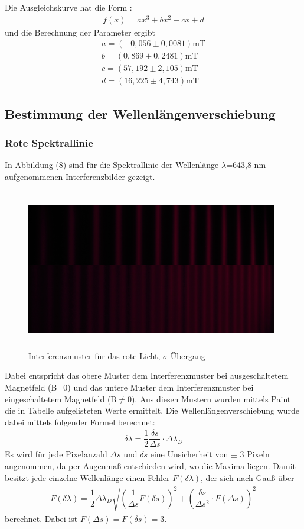 \documentclass{article}
\begin{document}
Die Ausgleichskurve hat die Form : 
\begin{align}
f(x)=ax^3+bx^2+cx+d
\end{align}
und die Berechnung der Parameter ergibt 
\begin{align*}
a=(-0,056 \pm 0,0081)\text{mT} \\
b=(0,869      \pm   0,2481) \text{mT}\\
c=( 57,192       \pm    2,105) \text{mT} \\
d= ( 16,225        \pm   4,743) \text{mT}
\end{align*}

\subsection{Bestimmung der Wellenlängenverschiebung }
\subsubsection{Rote Spektrallinie }
In Abbildung (8) sind für die Spektrallinie der Wellenlänge $\lambda$=643,8 nm aufgenommenen Interferenzbilder gezeigt. 

\begin{figure}[H]
	\centering
	\includegraphics[height=7cm,width=11cm]{vergleichrotelinie.png}
	\caption{Interferenzmuster für das rote Licht, $\sigma$-Übergang }
	\label{fig: abb. 1}
\end{figure} 

Dabei entspricht das obere Muster dem Interferenzmuster bei ausgeschaltetem Magnetfeld (B=0) und das untere Muster dem Interferenzmuster bei eingeschaltetem Magnetfeld (B$\ne$0). Aus diesen Mustern wurden mittels Paint die in Tabelle aufgelisteten Werte ermittelt. Die Wellenlängenverschiebung wurde dabei mittels folgender Formel berechnet: 
\begin{align}
\delta\lambda= \dfrac{1}{2} \dfrac{\delta s}{\Delta s} \cdot \Delta \lambda_D
\end{align}
Es wird für jede Pixelanzahl $\Delta s$ und $\delta s$ eine Unsicherheit von $\pm$ 3 Pixeln angenommen, da per Augenmaß entschieden wird, wo die Maxima liegen. Damit besitzt jede einzelne Wellenlänge einen Fehler $F(\delta\lambda)$, der sich nach Gauß über 
\begin{align}
F(\delta \lambda)= \dfrac{1}{2}\Delta \lambda_D \sqrt{\left(\dfrac{1}{\Delta s}F(\delta s)\right)^2 + \left(\dfrac{\delta s}{\Delta s^2 }\cdot F(\Delta s)\right)^2}
\end{align}
berechnet. Dabei ist $F(\Delta s)=F(\delta s)=3$.
\end{document}
